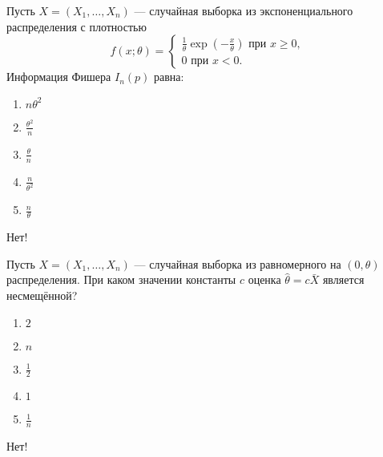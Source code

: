 \documentclass[t]{beamer}
\begin{document}
 \begin{frame} \label{41-No} 
\begin{block}{41} 

Пусть $X = (X_1, \ldots , X_n)$ — случайная выборка из экспоненциального распределения с плотностью
\[
f(x; \theta) =
\begin{cases}
\frac{1}{\theta}\exp(-\frac{x}{\theta}) \text{ при } x \geq 0,  \\
0 \text{ при } x < 0.
\end{cases}
\]
Информация Фишера $I_n(p)$ равна:

 \end{block} 
\begin{enumerate} 
\item[] \hyperlink{41-No}{\beamergotobutton{} $n \theta^2$}
\item[] \hyperlink{41-No}{\beamergotobutton{} $\frac{\theta^2}{n}$}
\item[] \hyperlink{41-No}{\beamergotobutton{} $\frac{\theta}{n}$}
\item[] \hyperlink{41-Yes}{\beamergotobutton{} $\frac{n}{\theta^2}$}
\item[] \hyperlink{41-No}{\beamergotobutton{} $\frac{n}{\theta}$}
\end{enumerate} 

 \alert{Нет!} 
\end{frame} 


 \begin{frame} \label{42-No} 
\begin{block}{42} 

Пусть $X = (X_1, \ldots , X_n)$ — случайная выборка из равномерного на $(0, \theta)$ распределения. При каком значении константы $c$ оценка  $\hat{\theta} = c \bar{X}$ является несмещённой?
  


 \end{block} 
\begin{enumerate} 
\item[] \hyperlink{42-Yes}{\beamergotobutton{} $2$}
\item[] \hyperlink{42-No}{\beamergotobutton{} $n$}
\item[] \hyperlink{42-No}{\beamergotobutton{} $\frac{1}{2}$}
\item[] \hyperlink{42-No}{\beamergotobutton{} $1$}
\item[] \hyperlink{42-No}{\beamergotobutton{} $\frac{1}{n}$}
\end{enumerate} 

 \alert{Нет!} 
\end{frame} 
\end{document}
